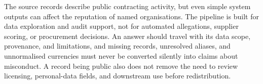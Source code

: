 The source records describe public contracting activity, but even simple system outputs can
affect the reputation of named organisations.  The pipeline is built for data exploration and
audit support, not for automated allegations, supplier scoring, or procurement decisions.  An
answer should travel with its data scope, provenance, and limitations, and missing records,
unresolved aliases, and unnormalised currencies must never be converted silently into claims
about misconduct.  A record being public also does not remove the need to review licensing,
personal-data fields, and downstream use before redistribution.
